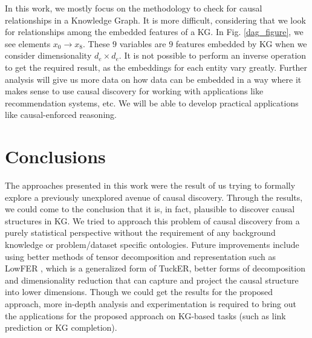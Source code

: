 \documentclass{article}
\begin{document}
\begin{itemize}
In this work, we mostly focus on the methodology to check for causal relationships in a Knowledge Graph.
It is more difficult, considering that we look for relationships among the embedded features of a KG. 
In Fig. \ref{dag_figure}, we see elements $x_0 \rightarrow x_8$. These $9$ variables are $9$ features embedded by KG when we consider dimensionality $d_e \times d_e$. It is not possible to perform an inverse operation to get the required result, as the embeddings for each entity vary greatly. 
Further analysis will give us more data on how data can be embedded in a way where it makes sense to use causal discovery for working with applications like recommendation systems, etc.
We will be able to develop practical applications like causal-enforced reasoning.
\end{itemize}

\section{Conclusions} \label{conclusions}
The approaches presented in this work were the result of us trying to formally explore a previously unexplored avenue of causal discovery. Through the results, we could come to the conclusion that it is, in fact, plausible to discover causal structures in KG. We tried to approach this problem of causal discovery from a purely statistical perspective without the requirement of any background knowledge or problem/dataset specific ontologies. Future improvements include using better methods of tensor decomposition and representation such as LowFER \cite{amin2020lowfer}, which is a generalized form of TuckER, better forms of decomposition and dimensionality reduction that can capture and project the causal structure into lower dimensions.  Though we could get the results for the proposed approach, more in-depth analysis and experimentation is required to bring out the applications for the proposed approach on KG-based tasks (such as link prediction or KG completion). 





\end{document}
